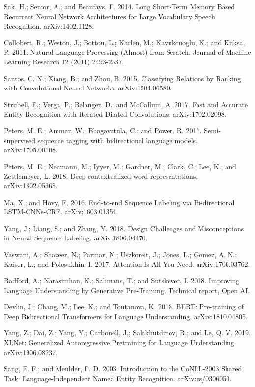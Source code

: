 \documentclass[letterpaper]{article} %
\begin{document}
\smallskip \noindent
Sak, H.; Senior, A.; and Beaufays, F. 2014. Long Short-Term Memory Based Recurrent Neural Network Architectures for Large Vocabulary Speech Recognition. arXiv:1402.1128.

\smallskip \noindent 
Collobert, R.; Weston, J.; Bottou, L.; Karlen, M.; Kavukcuoglu, K.; and Kuksa, P. 2011. Natural Language Processing (Almost) from Scratch. Journal of Machine Learning Research 12 (2011) 2493-2537. 

\smallskip \noindent
Santos. C. N.; Xiang, B.; and Zhou, B. 2015. Classifying Relations by Ranking with Convolutional Neural Networks. arXiv:1504.06580. 

\smallskip \noindent
Strubell, E.; Verga, P.; Belanger, D.; and McCallum, A. 2017. Fast and Accurate Entity Recognition with Iterated Dilated Convolutions. arXiv:1702.02098. 

\smallskip \noindent
Peters, M. E.; Ammar, W.; Bhagavatula, C.; and Power. R.  2017. Semi-supervised sequence tagging with bidirectional language models. arXiv:1705.00108.

\smallskip \noindent 
Peters, M. E.; Neumann, M.; Iyyer, M.; Gardner, M.; Clark, C.; Lee, K.; and Zettlemoyer, L. 2018. Deep contextualized word representations. arXiv:1802.05365. 

\smallskip \noindent
Ma, X.; and Hovy, E. 2016. End-to-end Sequence Labeling via Bi-directional LSTM-CNNs-CRF. arXiv:1603.01354. 

\smallskip \noindent
Yang, J.; Liang, S.; and Zhang, Y. 2018. Design Challenges and Misconceptions in Neural Sequence Labeling. arXiv:1806.04470. 

\smallskip \noindent
Vaswani, A.; Shazeer, N.; Parmar, N.; Uszkoreit, J.; Jones, L.; Gomez, A. N.; Kaiser, L.; and Polosukhin, I. 2017. Attention Is All You Need. arXiv:1706.03762. 

\smallskip \noindent
Radford, A.; Narasimhan, K.; Salimans, T.; and Sutskever, I. 2018. Improving Language Understanding by Generative Pre-Training. Technical report, Open AI.

\smallskip \noindent
Devlin, J.; Chang, M.; Lee, K.; and Toutanova, K. 2018. BERT: Pre-training of Deep Bidirectional Transformers for Language Understanding. arXiv:1810.04805.

\smallskip \noindent
Yang, Z.; Dai, Z.; Yang, Y.; Carbonell, J.; Salakhutdinov, R.; and Le, Q. V. 2019. XLNet: Generalized Autoregressive Pretraining for Language Understanding. arXiv:1906.08237.

\smallskip \noindent
Sang, E. F.; and Meulder, F. D. 2003. Introduction to the CoNLL-2003 Shared Task: Language-Independent Named Entity Recognition. arXiv:cs/0306050. 
\end{document}
